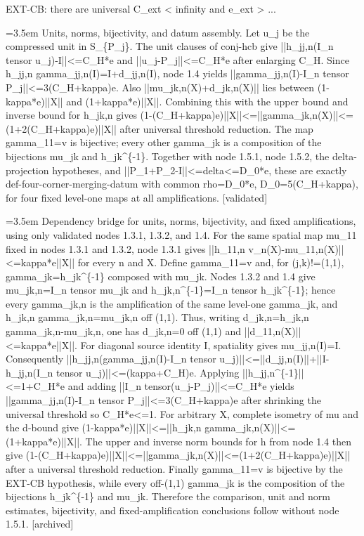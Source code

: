 \documentclass{article}
\newcommand{\step}[1]{\par\noindent\hangindent=3.5em\hangafter=1%
  \makebox[3.5em][l]{\textbf{#1.}}}
\newcommand{\steptag}[1]{\hfill{\small\textsf{[#1]}}}
\begin{document}
\begin{proofbox}{EXT-CB: there are universal C\_ext < infinity and e\_ext > ...}
\step{1.5.3} Units, norms, bijectivity, and datum assembly. Let u\_j be the compressed unit in S\_\{P\_j\}. The unit clauses of conj-hcb give ||h\_jj,n(I\_n tensor u\_j)-I||<=C\_H*e and ||u\_j-P\_j||<=C\_H*e after enlarging C\_H. Since h\_jj,n gamma\_jj,n(I)=I+d\_jj,n(I), node 1.4 yields ||gamma\_jj,n(I)-I\_n tensor P\_j||<=3(C\_H+kappa)e. Also ||mu\_jk,n(X)+d\_jk,n(X)|| lies between (1-kappa*e)||X|| and (1+kappa*e)||X||. Combining this with the upper bound and inverse bound for h\_jk,n gives (1-(C\_H+kappa)e)||X||<=||gamma\_jk,n(X)||<=(1+2(C\_H+kappa)e)||X|| after universal threshold reduction. The map gamma\_11=v is bijective; every other gamma\_jk is a composition of the bijections mu\_jk and h\_jk\textasciicircum{}\{-1\}. Together with node 1.5.1, node 1.5.2, the delta-projection hypotheses, and ||P\_1+P\_2-I||<=delta<=D\_0*e, these are exactly def-four-corner-merging-datum with common rho=D\_0*e, D\_0=5(C\_H+kappa), for four fixed level-one maps at all amplifications. \steptag{validated} \\[6pt]
\step{1.5.3.1} Dependency bridge for units, norms, bijectivity, and fixed amplifications, using only validated nodes 1.3.1, 1.3.2, and 1.4. For the same spatial map mu\_11 fixed in nodes 1.3.1 and 1.3.2, node 1.3.1 gives ||h\_11,n v\_n(X)-mu\_11,n(X)||<=kappa*e||X|| for every n and X. Define gamma\_11=v and, for (j,k)!=(1,1), gamma\_jk=h\_jk\textasciicircum{}\{-1\} composed with mu\_jk. Nodes 1.3.2 and 1.4 give mu\_jk,n=I\_n tensor mu\_jk and h\_jk,n\textasciicircum{}\{-1\}=I\_n tensor h\_jk\textasciicircum{}\{-1\}; hence every gamma\_jk,n is the amplification of the same level-one gamma\_jk, and h\_jk,n gamma\_jk,n=mu\_jk,n off (1,1). Thus, writing d\_jk,n=h\_jk,n gamma\_jk,n-mu\_jk,n, one has d\_jk,n=0 off (1,1) and ||d\_11,n(X)||<=kappa*e||X||. For diagonal source identity I, spatiality gives mu\_jj,n(I)=I. Consequently ||h\_jj,n(gamma\_jj,n(I)-I\_n tensor u\_j)||<=||d\_jj,n(I)||+||I-h\_jj,n(I\_n tensor u\_j)||<=(kappa+C\_H)e. Applying ||h\_jj,n\textasciicircum{}\{-1\}||<=1+C\_H*e and adding ||I\_n tensor(u\_j-P\_j)||<=C\_H*e yields ||gamma\_jj,n(I)-I\_n tensor P\_j||<=3(C\_H+kappa)e after shrinking the universal threshold so C\_H*e<=1. For arbitrary X, complete isometry of mu and the d-bound give (1-kappa*e)||X||<=||h\_jk,n gamma\_jk,n(X)||<=(1+kappa*e)||X||. The upper and inverse norm bounds for h from node 1.4 then give (1-(C\_H+kappa)e)||X||<=||gamma\_jk,n(X)||<=(1+2(C\_H+kappa)e)||X|| after a universal threshold reduction. Finally gamma\_11=v is bijective by the EXT-CB hypothesis, while every off-(1,1) gamma\_jk is the composition of the bijections h\_jk\textasciicircum{}\{-1\} and mu\_jk. Therefore the comparison, unit and norm estimates, bijectivity, and fixed-amplification conclusions follow without node 1.5.1. \steptag{archived} \\[6pt]

\end{proofbox}
\end{document}

